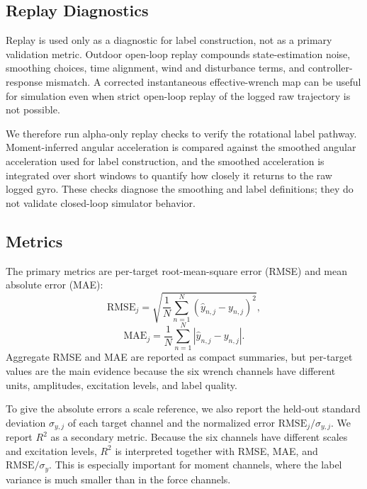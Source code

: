 \subsection{Replay Diagnostics}
\label{subsec:replay_diagnostics}

Replay is used only as a diagnostic for label construction, not as a primary validation metric. Outdoor open-loop replay compounds state-estimation noise, smoothing choices, time alignment, wind and disturbance terms, and controller-response mismatch. A corrected instantaneous effective-wrench map can be useful for simulation even when strict open-loop replay of the logged raw trajectory is not possible.

We therefore run alpha-only replay checks to verify the rotational label pathway. Moment-inferred angular acceleration is compared against the smoothed angular acceleration used for label construction, and the smoothed acceleration is integrated over short windows to quantify how closely it returns to the raw logged gyro. These checks diagnose the smoothing and label definitions; they do not validate closed-loop simulator behavior.

\subsection{Metrics}
\label{subsec:metrics}

The primary metrics are per-target root-mean-square error (RMSE) and mean absolute error (MAE):
\begin{equation}
  \mathrm{RMSE}_{j}
  =
  \sqrt{
    \frac{1}{N}
    \sum_{n=1}^{N}
    \left(
      \hat{y}_{n,j} - y_{n,j}
    \right)^2
  },
  \label{eq:rmse}
\end{equation}
\begin{equation}
  \mathrm{MAE}_{j}
  =
  \frac{1}{N}
  \sum_{n=1}^{N}
  \left|
    \hat{y}_{n,j} - y_{n,j}
  \right|.
  \label{eq:mae}
\end{equation}
Aggregate RMSE and MAE are reported as compact summaries, but per-target values are the main evidence because the six wrench channels have different units, amplitudes, excitation levels, and label quality.

To give the absolute errors a scale reference, we also report the held-out
standard deviation $\sigma_{y,j}$ of each target channel and the normalized
error $\mathrm{RMSE}_j/\sigma_{y,j}$. We report $R^2$ as a secondary metric.
Because the six channels have different scales and excitation levels, $R^2$ is
interpreted together with RMSE, MAE, and $\mathrm{RMSE}/\sigma_y$. This is
especially important for moment channels, where the label variance is much
smaller than in the force channels.
